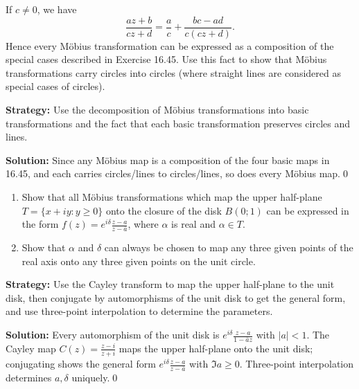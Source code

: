 \begin{problembox}
\begin{problemstatement}
If \( c \neq 0 \), we have
\[ \frac{a z + b}{c z + d} = \frac{a}{c} + \frac{b c - a d}{c (c z + d)}. \]
Hence every Möbius transformation can be expressed as a composition of the special cases described in Exercise 16.45. Use this fact to show that Möbius transformations carry circles into circles (where straight lines are considered as special cases of circles).
\end{problemstatement}
\end{problembox}

\noindent\textbf{Strategy:} Use the decomposition of Möbius transformations into basic transformations and the fact that each basic transformation preserves circles and lines.

\bigskip\noindent\textbf{Solution:}
Since any Möbius map is a composition of the four basic maps in 16.45, and each carries circles/lines to circles/lines, so does every Möbius map.\qed


\begin{problembox}
\begin{problemstatement}
\begin{enumerate}[label=(\alph*)]
\item Show that all Möbius transformations which map the upper half-plane \( T = \{ x + i y : y \geq 0 \} \) onto the closure of the disk \( B(0; 1) \) can be expressed in the form \( f(z) = e^{i \delta} \frac{z - a}{z - \bar{a}} \), where \( \alpha \) is real and \( \alpha \in T \).
\item Show that \( \alpha \) and \( \delta \) can always be chosen to map any three given points of the real axis onto any three given points on the unit circle.
\end{enumerate}
\end{problemstatement}
\end{problembox}

\noindent\textbf{Strategy:} Use the Cayley transform to map the upper half-plane to the unit disk, then conjugate by automorphisms of the unit disk to get the general form, and use three-point interpolation to determine the parameters.

\bigskip\noindent\textbf{Solution:}
Every automorphism of the unit disk is $e^{i\delta}\frac{z-a}{1-\bar a z}$ with $|a|<1$. The Cayley map $C(z)=\frac{z-i}{z+i}$ maps the upper half-plane onto the unit disk; conjugating shows the general form $e^{i\delta}\frac{z-a}{z-\bar a}$ with $\Im a\ge0$. Three-point interpolation determines $a,\delta$ uniquely.\qed


